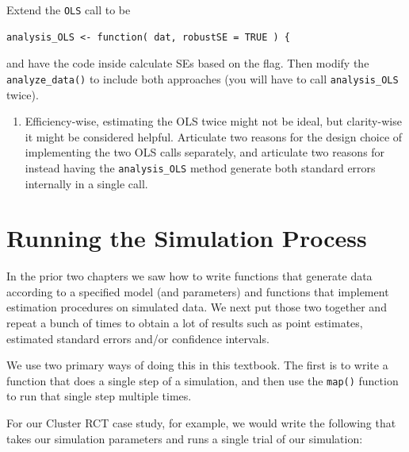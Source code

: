 \documentclass[
]{book}
\providecommand{\tightlist}{%
  \setlength{\itemsep}{0pt}\setlength{\parskip}{0pt}}
\begin{document}
Extend the \texttt{OLS} call to be

\begin{verbatim}
analysis_OLS <- function( dat, robustSE = TRUE ) {
\end{verbatim}

and have the code inside calculate SEs based on the flag. Then modify the \texttt{analyze\_data()} to include both approaches (you will have to call \texttt{analysis\_OLS} twice).

\begin{enumerate}
\def\labelenumi{\arabic{enumi}.}
\setcounter{enumi}{3}
\tightlist
\item
  Efficiency-wise, estimating the OLS twice might not be ideal, but clarity-wise it might be considered helpful. Articulate two reasons for the design choice of implementing the two OLS calls separately, and articulate two reasons for instead having the \texttt{analysis\_OLS} method generate both standard errors internally in a single call.
\end{enumerate}

\chapter{Running the Simulation Process}\label{running-the-simulation-process}

In the prior two chapters we saw how to write functions that generate data according to a specified model (and parameters) and functions that implement estimation procedures on simulated data.
We next put those two together and repeat a bunch of times to obtain a lot of results such as point estimates, estimated standard errors and/or confidence intervals.

We use two primary ways of doing this in this textbook.
The first is to write a function that does a single step of a simulation, and then use the \texttt{map()} function to run that single step multiple times.

For our Cluster RCT case study, for example, we would write the following that takes our simulation parameters and runs a single trial of our simulation:
\end{document}
